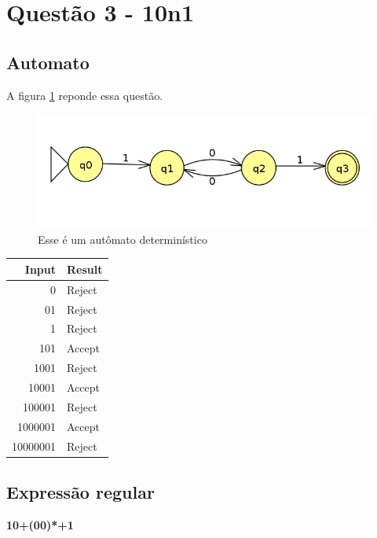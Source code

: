 \documentclass[11pt]{article}
\begin{document}
\section{Questão 3 - 10n1}
\label{sec:orgb57c2e1}
\subsection{Automato}
\label{sec:orgdb3c097}
A figura \ref{fig:orgd5ae3d1} reponde essa questão. 

\begin{figure}[htbp]
\centering
\includegraphics[width=.9\linewidth]{./q3/q3.jpg}
\caption{\label{fig:orgd5ae3d1}
Esse é um autômato determinístico}
\end{figure}

\begin{center}
\begin{tabular}{rl}
Input & Result\\
\hline
0 & Reject\\
01 & Reject\\
1 & Reject\\
101 & Accept\\
1001 & Reject\\
10001 & Accept\\
100001 & Reject\\
1000001 & Accept\\
10000001 & Reject\\
\end{tabular}
\end{center}
\subsection{Expressão regular}
\label{sec:orgd4b95c2}

\textbf{10+(00)*+1} 
\end{document}
